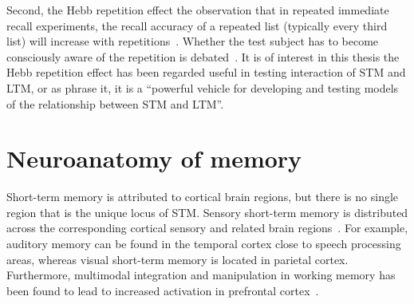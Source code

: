 Second, the Hebb repetition effect the observation that in repeated immediate recall experiments, the recall accuracy of a repeated list (typically every third list) will increase with repetitions~\parencite{Hebb1961}.
Whether the test subject has to become consciously aware of the repetition is debated~\parencite{Stadler1993}.
It is of interest in this thesis the Hebb repetition effect has been regarded useful in testing interaction of STM and LTM, or as \textcite{Burgess2005} phrase it, it is  a ``powerful vehicle for developing and testing models of the relationship between STM and LTM''.


\section{Neuroanatomy of memory}
Short-term memory is attributed to cortical brain regions, but there is no single region that is the unique locus of STM\@.
Sensory short-term memory is distributed across the corresponding cortical sensory and related brain regions~\parencite{zelano2009,todd2004,baldo2012}.
For example, auditory memory can be found in the temporal cortex close to speech processing areas, whereas visual short-term memory is located in parietal cortex.
Furthermore, multimodal integration and manipulation in working memory has been found to lead to increased activation in prefrontal cortex~\parencite{rypma1999}.

